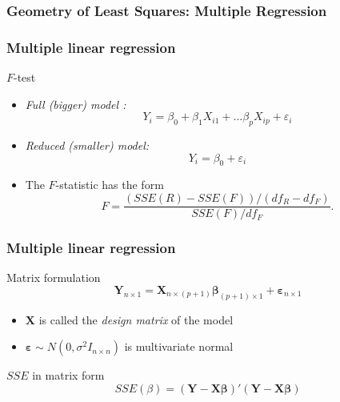 \documentclass[handout]{beamer}
\begin{document}

   \begin{frame} \frametitle{Geometry of Least Squares: Multiple Regression}

   \end{frame}


   \begin{frame} \frametitle{Multiple linear regression}

   \begin{block}
   {$F$-test}
   \begin{itemize}
   \item {\em Full (bigger) model :}
   $$
   Y_i = \beta_0 + \beta_1 X_{i1} + \dots \beta_p X_{ip} + \varepsilon_i$$
   \item {\em Reduced (smaller) model:}
   $$
   Y_i = \beta_0  + \varepsilon_i$$

   \item The $F$-statistic has the form
   $$
   F=\frac{(SSE(R) - SSE(F)) / (df_R - df_F)}{SSE(F) / df_F}.$$

   \end{itemize}
   \end{block}
   \end{frame}


   \begin{frame} \frametitle{Multiple linear regression}

   \begin{block}
   {Matrix formulation}
   $${\pmb Y}_{n \times 1} = \pmb{X}_{n \times (p + 1)} \pmb{\beta}_{(p+1) \times 1} + \pmb{\varepsilon}_{n \times 1}$$
   \begin{itemize}

   \item $\pmb{X}$ is called the {\em design matrix} of the model
   \item $\pmb{\varepsilon} \sim N(0, \sigma^2 I_{n \times n})$ is multivariate normal
   \end{itemize}
   \end{block}
   \begin{block}
   {$SSE$ in matrix form}
   $$
   SSE(\beta) = (\pmb{Y} - \pmb{X} \pmb{\beta})'(\pmb{Y} - \pmb{X} \pmb{\beta})
   $$

   \end{block}
   \end{frame}
\end{document}

